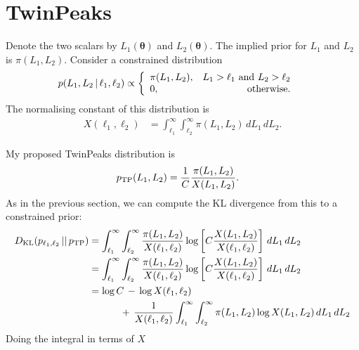 \documentclass[a4paper, 12pt]{article}
\newcommand{\btheta}{\boldsymbol{\theta}}
\newcommand{\tn}{\textnormal}
\begin{document}
\section*{TwinPeaks}
Denote the two scalars by $L_1(\btheta)$ and $L_2(\btheta)$.
The implied prior for $L_1$ and $L_2$ is $\pi(L_1, L_2)$.
Consider a constrained distribution
\begin{align}
p(L_1, L_2 \,|\, \ell_1, \ell_2) &\propto
    \left\{
        \begin{array}{lr}
            \pi(L_1, L_2),  &   L_1 > \ell_1 \tn{ and } L_2 > \ell_2 \\
            0,              &   \tn{otherwise}.
        \end{array}
    \right.
\end{align}
The normalising constant of this distribution is
\begin{align}
X(\ell_1, \ell_2) &=
    \int_{\ell_1}^{\infty}
    \int_{\ell_2}^{\infty}
        \pi(L_1, L_2)
    \, dL_1
    \, dL_2.
\end{align}

My proposed TwinPeaks distribution is
\begin{align}
p_{\rm TP}(L_1, L_2) &=
  \frac{1}{C}
  \frac{\pi(L_1, L_2)}{X(L_1, L_2)}.
\end{align}
As in the previous section, we can compute the KL divergence from
this to a constrained prior:
\begin{align}
D_{\rm KL}(p_{\ell_1, \ell_2} \,||\, p_{\rm TP})
  &= \int_{\ell_1}^{\infty}
     \int_{\ell_2}^{\infty}
         \frac{\pi(L_1, L_2)}{X(\ell_1, \ell_2)}
         \log\left[C \frac{X(L_1, L_2)}{X(\ell_1, \ell_2)} \right]
     \, dL_1
     \, dL_2 \\
  &=
     \int_{\ell_1}^{\infty}
     \int_{\ell_2}^{\infty}
         \frac{\pi(L_1, L_2)}{X(\ell_1, \ell_2)}
         \log\left[C \frac{X(L_1, L_2)}{X(\ell_1, \ell_2)} \right]
     \, dL_1
     \, dL_2 \\
  &=
     \log C \,-\, \log X(\ell_1, \ell_2) \\ &\quad\quad\quad
     \,+\,
     \frac{1}{X(\ell_1, \ell_2)}
     \int_{\ell_1}^{\infty}
     \int_{\ell_2}^{\infty}
         \pi(L_1, L_2)
         \log X(L_1, L_2)
     \, dL_1
     \, dL_2 \\
\end{align}
Doing the integral in terms of $X$
\end{document}
